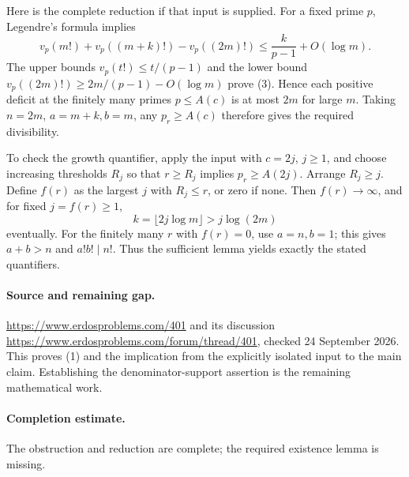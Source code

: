 Here is the complete reduction if that input is supplied.
For a fixed prime \(p\), Legendre's formula implies
\[
 v_p(m!)+v_p((m+k)!)-v_p((2m)!)
 \leq \frac{k}{p-1}+O(\log m).
 \tag{3}
\]
The upper bounds \(v_p(t!)\leq t/(p-1)\) and the
lower bound \(v_p((2m)!)\geq2m/(p-1)-O(\log m)\) prove (3).
Hence each positive deficit at the finitely many primes \(p\leq A(c)\)
is at most \(2m\) for large \(m\). Taking \(n=2m\),
\(a=m+k,b=m\), any \(p_r\geq A(c)\) therefore gives the required
divisibility.

To check the growth quantifier, apply the input with \(c=2j\), \(j\geq1\),
and choose increasing thresholds \(R_j\) so that \(r\geq R_j\) implies
\(p_r\geq A(2j)\). Arrange \(R_j\geq j\).
Define \(f(r)\) as the largest \(j\) with \(R_j\leq r\), or zero if none.
Then \(f(r)\to\infty\), and for fixed \(j=f(r)\geq1\),
\[
 k=\lfloor2j\log m\rfloor>j\log(2m)
\]
eventually. For the finitely many \(r\) with \(f(r)=0\), use
\(a=n,b=1\); this gives \(a+b>n\) and \(a!b!\mid n!\).
Thus the sufficient lemma yields exactly the stated quantifiers.

\paragraph{Source and remaining gap.}
\url{https://www.erdosproblems.com/401} and its discussion
\url{https://www.erdosproblems.com/forum/thread/401},
checked 24 September 2026. This proves (1) and the implication from
the explicitly isolated input to the main claim. Establishing the
denominator-support assertion is the remaining mathematical work.

\paragraph{Completion estimate.}
The obstruction and reduction are complete; the required existence lemma is missing.
